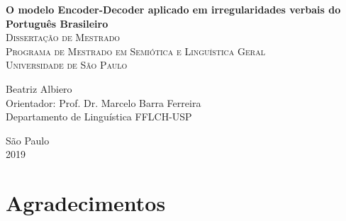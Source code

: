 \documentclass[12pt,twoside,a4paper]{book}
\begin{document}
\frontmatter 


\onehalfspacing  %

\thispagestyle{empty}
\begin{center}
    \vspace*{2.3cm}
    \textbf{\Large{O modelo Encoder-Decoder aplicado em irregularidades verbais do Português Brasileiro
}}\\
    
    
    \vskip 2cm
    \textsc{
    Dissertação de Mestrado\\[+0.5cm]
    Programa de Mestrado em Semiótica e Linguística Geral\\[+0.5cm]
    Universidade de São Paulo\\[+0.5cm]
   }
    
    \vspace*{6.2cm}
    Beatriz Albiero\\
    Orientador: Prof. Dr. Marcelo Barra Ferreira\\
    Departamento de Linguística FFLCH-USP
    
    \vskip 0.5cm
    \normalsize{São Paulo\\ 2019}
\end{center}

\makeatletter\@openrightfalse\makeatother
{}





\chapter*{Agradecimentos}
\end{document}
